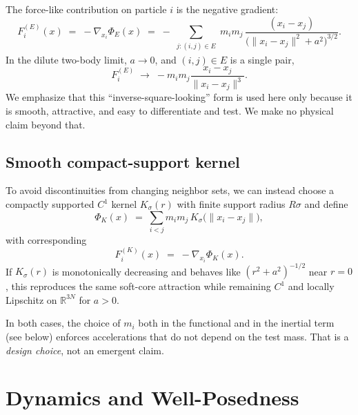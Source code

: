 \documentclass[11pt]{article}
\begin{document}
The force-like contribution on particle $i$ is the negative gradient:
\begin{equation}
    F^{(E)}_i(x)
    \;=\;
    -\nabla_{x_i} \Phi_E(x)
    \;=\;
    - \sum_{\substack{j : (i,j)\in E}}
    m_i m_j \,
    \frac{(x_i-x_j)}
         {\big(\|x_i-x_j\|^2+a^2\big)^{3/2}}.
    \label{eq:forceE}
\end{equation}
In the dilute two-body limit, $a\to0$, and $(i,j)\in E$ is a single pair,
\begin{equation}
    F^{(E)}_i
    \;\to\;
    -m_i m_j
    \frac{x_i-x_j}{\|x_i-x_j\|^3}.
\end{equation}
We emphasize that this “inverse-square-looking” form is used here only because it is smooth, attractive, and easy to differentiate and test.
We make no physical claim beyond that.

\subsection{Smooth compact-support kernel}
To avoid discontinuities from changing neighbor sets, we can instead choose a compactly supported $C^1$ kernel $K_\sigma(r)$ with finite support radius $R\sigma$ and define
\begin{equation}
    \Phi_K(x)
    \;=\;
    \sum_{i<j}
    m_i m_j \,
    K_\sigma\big(\|x_i-x_j\|\big),
    \label{eq:phiK}
\end{equation}
with corresponding
\begin{equation}
    F^{(K)}_i(x)
    \;=\;
    -\nabla_{x_i}\Phi_K(x).
\end{equation}
If $K_\sigma(r)$ is monotonically decreasing and behaves like $(r^2+a^2)^{-1/2}$ near $r{=}0$, this reproduces the same soft-core attraction while remaining $C^1$ and locally Lipschitz on $\mathbb{R}^{3N}$ for $a>0$.

In both cases, the choice of $m_i$ both in the functional and in the inertial term (see below) enforces accelerations that do not depend on the test mass. That is a \emph{design choice}, not an emergent claim.

\section{Dynamics and Well-Posedness}
\end{document}
